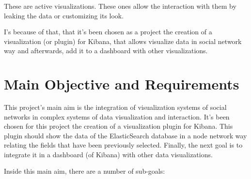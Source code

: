 \documentclass[a4paper, 12pt]{book}
\begin{document}
These are active visualizations. These ones allow the interaction with them by leaking the data or customizing its look.

I's because of that, that it's been chosen as a project the creation of a visualization (or plugin) for Kibana, that allows visualize data in social network way and afterwards, add it to a dashboard with other visualizations.

\section{Main Objective and Requirements}
\label{sec:mainobj}



This project's main aim is the integration of visualization systems of social networks in complex systems of data visualization and interaction. It's been chosen for this project the creation of a visualization plugin for Kibana. This plugin should show the data of the ElasticSearch database in a node network way relating the fields that have been previously selected. Finally, the next goal is to integrate it in a dashboard (of Kibana) with other data visualizations.

Inside this main aim, there are a number of sub-goals:
\end{document}
